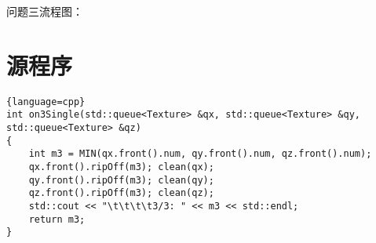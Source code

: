 \documentclass[bwprint]{cumcmthesis}    %
\begin{document}
问题三流程图：
\appendix

\section{源程序}

\begin{lstlisting}{language=cpp}
int on3Single(std::queue<Texture> &qx, std::queue<Texture> &qy, std::queue<Texture> &qz)
{
    int m3 = MIN(qx.front().num, qy.front().num, qz.front().num);
    qx.front().ripOff(m3); clean(qx);
    qy.front().ripOff(m3); clean(qy);
    qz.front().ripOff(m3); clean(qz);
    std::cout << "\t\t\t\t3/3: " << m3 << std::endl;
    return m3;
}

\end{lstlisting}
\end{document}
